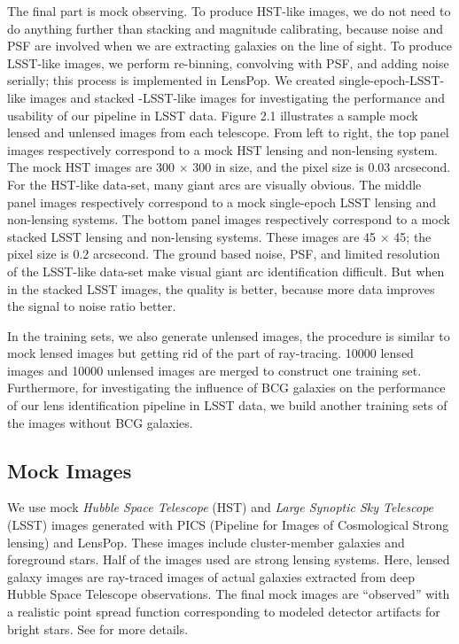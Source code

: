 \documentclass{emulateapj}
\begin{document}
The final part is mock observing. To produce HST-like images, we do
not need to do anything further than stacking and magnitude
calibrating, because noise and PSF are involved when we are extracting
galaxies on the line of sight. To produce LSST-like images, we perform
re-binning, convolving with PSF, and adding noise serially; this
process is implemented in LensPop. We created single-epoch-LSST-like
images and stacked -LSST-like images for investigating the performance
and usability of our pipeline in LSST data. Figure 2.1 illustrates a
sample mock lensed and unlensed images from each telescope. From left
to right, the top panel images respectively correspond to a mock HST
lensing and non-lensing system. The mock HST images are 300 × 300 in
size, and the pixel size is 0.03 arcsecond. For the HST-like data-set,
many giant arcs are visually obvious. The middle panel images
respectively correspond to a mock single-epoch LSST lensing and
non-lensing systems. The bottom panel images respectively correspond
to a mock stacked LSST lensing and non-lensing systems. These images
are 45 × 45; the pixel size is 0.2 arcsecond. The ground based noise,
PSF, and limited resolution of the LSST-like data-set make visual
giant arc identification difficult. But when in the stacked LSST
images, the quality is better, because more data improves the signal
to noise ratio better.


In the training sets, we also generate unlensed images, the procedure
is similar to mock lensed images but getting rid of the part of
ray-tracing. 10000 lensed images and 10000 unlensed images are merged
to construct one training set. Furthermore, for investigating the
influence of BCG galaxies on the performance of our lens
identification pipeline in LSST data, we build another training sets
of the images without BCG galaxies.

\subsection{Mock Images}

We use mock {\em Hubble Space Telescope} (HST) and {\em Large Synoptic
  Sky Telescope} (LSST) images generated with PICS (Pipeline for
Images of Cosmological Strong lensing) \citep{li_etal16} and
LensPop\citep{collett_etal15}.  These images include cluster-member
galaxies and foreground stars.  Half of the images used are strong
lensing systems.  Here, lensed galaxy images are ray-traced images of
actual galaxies extracted from deep Hubble Space Telescope
observations.  The final mock images are ``observed'' with a realistic
point spread function corresponding to modeled detector artifacts for
bright stars.  See \cite{li_etal16} for more details.
\end{document}
